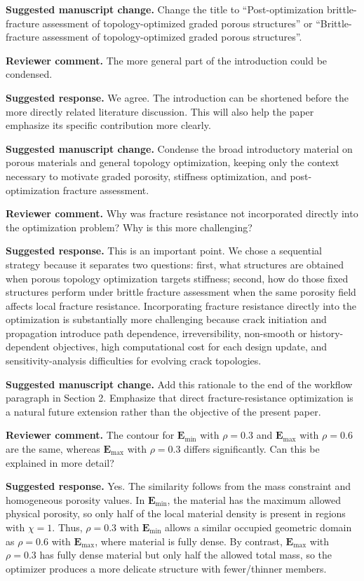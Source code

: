 \documentclass[11pt,a4paper]{article}
\newcommand{\Emin}{\ensuremath{\mathbf{E}_{\mathrm{min}}}}
\newcommand{\Emax}{\ensuremath{\mathbf{E}_{\mathrm{max}}}}
\newcommand{\comment}[1]{\par\noindent\textbf{Reviewer comment.} #1\par}
\newcommand{\response}[1]{\par\noindent\textbf{Suggested response.} #1\par}
\newcommand{\change}[1]{\par\noindent\textbf{Suggested manuscript change.} #1\par}
\begin{document}
\change{Change the title to ``Post-optimization brittle-fracture assessment of
topology-optimized graded porous structures'' or ``Brittle-fracture assessment
of topology-optimized graded porous structures''.}

\comment{The more general part of the introduction could be condensed.}

\response{We agree. The introduction can be shortened before the more directly
related literature discussion. This will also help the paper emphasize its
specific contribution more clearly.}

\change{Condense the broad introductory material on porous materials and
general topology optimization, keeping only the context necessary to motivate
graded porosity, stiffness optimization, and post-optimization fracture
assessment.}

\comment{Why was fracture resistance not incorporated directly into the
optimization problem? Why is this more challenging?}

\response{This is an important point. We chose a sequential strategy because it
separates two questions: first, what structures are obtained when porous
topology optimization targets stiffness; second, how do those fixed structures
perform under brittle fracture assessment when the same porosity field affects
local fracture resistance. Incorporating fracture resistance directly into the
optimization is substantially more challenging because crack initiation and
propagation introduce path dependence, irreversibility, non-smooth or
history-dependent objectives, high computational cost for each design update,
and sensitivity-analysis difficulties for evolving crack topologies.}

\change{Add this rationale to the end of the workflow paragraph in
Section 2. Emphasize that direct fracture-resistance optimization is a natural
future extension rather than the objective of the present paper.}

\comment{The contour for \(\Emin\) with \(\rho=0.3\) and \(\Emax\) with
\(\rho=0.6\) are the same, whereas \(\Emax\) with \(\rho=0.3\) differs
significantly. Can this be explained in more detail?}

\response{Yes. The similarity follows from the mass constraint and homogeneous
porosity values. In \(\Emin\), the material has the maximum allowed physical
porosity, so only half of the local material density is present in regions with
\(\chi=1\). Thus, \(\rho=0.3\) with \(\Emin\) allows a similar occupied
geometric domain as \(\rho=0.6\) with \(\Emax\), where material is fully dense.
By contrast, \(\Emax\) with \(\rho=0.3\) has fully dense material but only half
the allowed total mass, so the optimizer produces a more delicate structure
with fewer/thinner members.}
\end{document}
